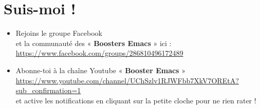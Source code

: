 \documentclass[11pt]{report}
\begin{document}
\chapter{Suis-moi !}
\label{sec:orgd5d05b4}

\begin{itemize}
\item Rejoins le groupe Facebook \\
et la communauté des « \textbf{Boosters Emacs} » ici :\\
\url{https://www.facebook.com/groups/286810496172489}

\item Abonne-toi à la chaîne Youtube « \textbf{Booster Emacs} » \\
\url{https://www.youtube.com/channel/UChSzlv1RJWFbb7XkV7OREtA?sub\_confirmation=1} \\
et active les notifications en cliquant sur la petite cloche pour ne rien
rater !
\end{itemize}
\end{document}
